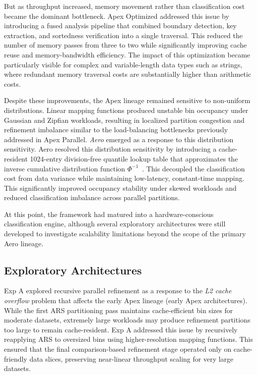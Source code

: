 But as throughput increased, memory movement rather than classification cost became the dominant bottleneck. 
Apex Optimized addressed this issue by introducing a fused analysis pipeline that combined boundary detection, key extraction, and sortedness verification into a single traversal. 
This reduced the number of memory passes from three to two while significantly improving cache reuse and memory-bandwidth efficiency. 
The impact of this optimization became particularly visible for complex and variable-length data types such as strings, where redundant memory traversal costs are substantially higher than arithmetic costs.

Despite these improvements, the Apex lineage remained sensitive to non-uniform distributions.
Linear mapping functions produced unstable bin occupancy under Gaussian and Zipfian workloads, resulting in localized partition congestion and refinement imbalance similar to the load-balancing bottlenecks previously addressed in Apex Parallel.
\textit{Aero} emerged as a response to this distribution sensitivity.
Aero resolved this distribution sensitivity by introducing a cache-resident 1024-entry division-free quantile lookup table that approximates the inverse cumulative distribution function $\Phi^{-1}$~\cite{devroyeNonUniformRandomVariate1986}. This decoupled the classification cost from data variance while maintaining low-latency, constant-time mapping.
This significantly improved occupancy stability under skewed workloads and reduced classification imbalance across parallel partitions.

At this point, the framework had matured into a hardware-conscious classification engine, although several exploratory architectures were still developed to investigate scalability limitations beyond the scope of the primary Aero lineage.

\subsection{Exploratory Architectures}
Exp A explored recursive parallel refinement as a response to the \textit{L2 cache overflow} problem that affects the early Apex lineage (early Apex architectures).
While the first ARS partitioning pass maintains cache-efficient bin sizes for moderate datasets, extremely large workloads may produce refinement partitions too large to remain cache-resident.
Exp A addressed this issue by recursively reapplying ARS to oversized bins using higher-resolution mapping functions.
This ensured that the final comparison-based refinement stage operated only on cache-friendly data slices, preserving near-linear throughput scaling for very large datasets.

